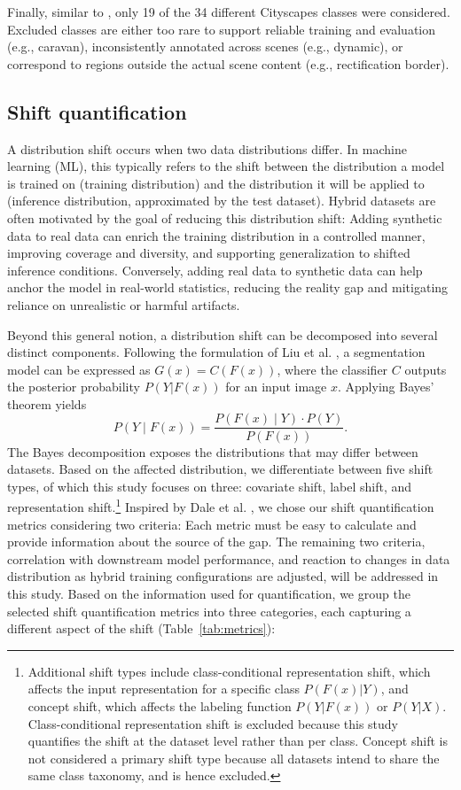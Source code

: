 \documentclass[conference]{IEEEtran}
\begin{document}
Finally, similar to \cite{cityscapes}, only 19 of the 34 different Cityscapes classes were considered. Excluded classes are either too rare to support reliable training and evaluation (e.g., caravan), inconsistently annotated across scenes (e.g., dynamic), or correspond to regions outside the actual scene content (e.g., rectification border).

\subsection{Shift quantification}
A distribution shift occurs when two data distributions differ. In machine learning (ML), this typically refers to the shift between the distribution a model is trained on (training distribution) and the distribution it will be applied to (inference distribution, approximated by the test dataset). Hybrid datasets are often motivated by the goal of reducing this distribution shift: Adding synthetic data to real data can enrich the training distribution in a controlled manner, improving coverage and diversity, and supporting generalization to shifted inference conditions. Conversely, adding real data to synthetic data can help anchor the model in real-world statistics, reducing the reality gap and mitigating reliance on unrealistic or harmful artifacts. 

Beyond this general notion, a distribution shift can be decomposed into several distinct components. Following the formulation of Liu et al. \cite{liu2022_labelShift}, a segmentation model can be expressed as $G(x)=C(F(x))$, where the classifier $C$ outputs the posterior probability $P(Y|F(x))$ for an input image $x$. Applying Bayes' theorem yields 
\begin{equation}
\label{eq:bayes_shift}
P(Y \mid F(x)) = \frac{P(F(x) \mid Y) \cdot P(Y)}{P(F(x))}.
\end{equation}
The Bayes decomposition exposes the distributions that may differ between datasets. Based on the affected distribution, we differentiate between five shift types, of which this study focuses on three: covariate shift, label shift, and representation shift.\footnote{Additional shift types include class-conditional representation shift, which affects the input representation for a specific class $P(F(x)|Y)$, and concept shift, which affects the labeling function $P(Y|F(x))$ or $P(Y|X)$. Class-conditional representation shift is excluded because this study quantifies the shift at the dataset level rather than per class. Concept shift is not considered a primary shift type because all datasets intend to share the same class taxonomy, and is hence excluded.} Inspired by Dale et al. \cite{dale2024}, we chose our shift quantification metrics considering two criteria: Each metric must be easy to calculate and provide information about the source of the gap. The remaining two criteria, correlation with downstream model performance, and reaction to changes in data distribution as hybrid training configurations are adjusted, will be addressed in this study. Based on the information used for quantification, we group the selected shift quantification metrics into three categories, each capturing a different aspect of the shift (Table~\ref{tab:metrics}):
\end{document}
